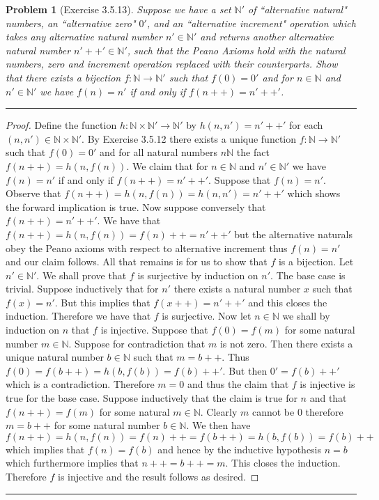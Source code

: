 \documentclass{article}
\newcommand{\lined}{\noindent\rule{\textwidth}{1pt}}
\newtheorem*{problem}{Problem}
\begin{document}
	\begin{problem}[Exercise 3.5.13]
		Suppose we have a set $\mathbb{N}'$ of ``alternative natural" numbers, an ``alternative  zero" $0'$, and an ``alternative increment"
		operation  which takes any alternative natural number $n' \in \mathbb{N}'$ and returns another alternative natural number $n'++' \in \mathbb{N}'$, such that the Peano Axioms hold with the natural numbers, zero and increment operation replaced with their counterparts. Show that there exists a bijection $f:\mathbb{N} \rightarrow \mathbb{N}'$ such that $f(0) = 0'$ and for $n \in \mathbb{N}$ and $n' \in \mathbb{N}'$ we have $f(n) = n'$ if and only if $f(n++) = n'++'$.
	\end{problem}
	
	\lined
		\begin{proof}
			Define the function $h: \mathbb{N} \times \mathbb{N}' \rightarrow \mathbb{N}'$ by 
			$h(n, n') = n'++'$ for each $(n,n') \in \mathbb{N} \times \mathbb{N}'$. By Exercise 3.5.12 there exists a unique function 
			$f:\mathbb{N} \rightarrow \mathbb{N}'$ such that $f(0) = 0'$ and for all natural numbers $n \mathbb{N}$ the fact $f(n++) = h(n,f(n))$. We claim that for $n \in \mathbb{N}$ and $n' \in \mathbb{N}'$ we have $f(n) = n'$ if and only if $f(n++) = n'++'$. Suppose that 
			$f(n) = n'$. Observe that $f(n++) = h(n,f(n)) = h(n,n') = n'++'$ which shows the forward implication is true. Now suppose conversely that $f(n++) = n'++'$. We have that $f(n++) = h(n,f(n)) = f(n)++ = n'++'$ but the alternative naturals obey the Peano axioms with respect to alternative increment thus $f(n) = n'$ and our claim follows. All that remains is for us to show that $f$ is a bijection. Let $n' \in \mathbb{N}'$. We shall prove that $f$ is surjective by induction on $n'$. The base case is trivial. Suppose inductively that for $n'$ there exists a natural number $x$ such that $f(x) = n'$. But this implies that 
			$f(x++) = n'++'$ and this closes the induction. Therefore we have that $f$ is surjective. Now let $n \in \mathbb{N}$ we shall by induction on $n$ that $f$ is injective. Suppose that $f(0) = f(m)$ for some natural number $m \in \mathbb{N}$. Suppose for contradiction that $m$ is not zero. Then there exists a unique natural number $b \in \mathbb{N}$ such that $m = b++$. Thus $f(0) = f(b++) = h(b,f(b)) = 
			f(b)++'$. But then $0' = f(b)++'$ which is a contradiction. Therefore $m = 0$ and thus the claim that $f$ is injective is true for the base case. Suppose inductively that the claim is true for $n$ and that $f(n++) = f(m)$ for some natural $m \in \mathbb{N}$. Clearly $m$ cannot be $0$ therefore $m = b++$ for some natural number $b \in \mathbb{N}$. We then have $f(n++) = h(n,f(n)) = f(n)++ = f(b++) = 
			h(b,f(b)) = f(b)++$  which implies that $f(n) = f(b)$ and hence by the inductive hypothesis $n = b$ which furthermore implies that $n++ = b++ = m$. This closes the induction. Therefore $f$ is injective and the result follows as desired. 
		\end{proof}
	\lined
	
	
	
\end{document}

